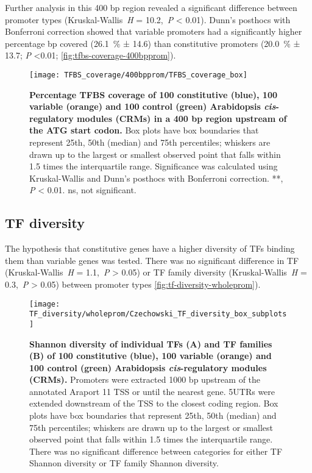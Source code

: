 \documentclass[../main.tex]{subfiles}
\begin{document}
Further analysis in this 400 bp region revealed a significant difference between promoter types (Kruskal\hyp{}Wallis~\textit{H} = 10.2,~\textit{P} \textless{} 0.01). Dunn's posthocs with Bonferroni correction showed that variable promoters had a significantly higher percentage bp covered (\SI{26.1}{\percent} ± 14.6) than constitutive promoters (\SI{20.0}{\percent} ± 13.7; \textit{P} \textless 0.01; \autoref{fig:tfbs-coverage-400bpprom}).

\begin{figure}[hbt!]
	\begin{center}
		\capstart
		\texttt{[image: TFBS\_coverage/400bpprom/TFBS\_coverage\_box]}
		\caption{
			\textbf{Percentage TFBS coverage of 100 constitutive (blue), 100 variable (orange) and 100 control (green) Arabidopsis \textit{cis}\hyp{}regulatory modules (CRMs) in a 400 bp region upstream of the ATG start codon.}
			Box plots have box boundaries that represent 25th, 50th (median) and 75th percentiles; whiskers are drawn up to the largest or smallest observed point that falls within 1.5 times the interquartile range.
			Significance was calculated using Kruskal\hyp{}Wallis and Dunn's posthocs with Bonferroni correction.
			**, \textit{P} \textless{} 0.01. ns, not significant.
			\label{fig:tfbs-coverage-400bpprom}
		}
	\end{center}
\end{figure}

\subsection{TF diversity}
The hypothesis that constitutive genes have a higher diversity of TFs binding them than variable genes was tested.
There was no significant difference in TF (Kruskal\hyp{}Wallis~\textit{H} = 1.1,~\textit{P} \textgreater{} 0.05) or TF family diversity (Kruskal\hyp{}Wallis~\textit{H} = 0.3,~\textit{P} \textgreater{} 0.05) between promoter types \autoref{fig:tf-diversity-wholeprom}).

\begin{figure}[hbt!]
	\begin{center}
		\capstart
		\texttt{[image: TF\_diversity/wholeprom/Czechowski\_TF\_diversity\_box\_subplots]}
		\caption{
			\textbf{Shannon diversity of individual TFs (A) and TF families (B) of 100 constitutive (blue), 100 variable (orange) and 100 control (green) Arabidopsis \textit{cis}\hyp{}regulatory modules (CRMs).}
			Promoters were extracted 1000 bp upstream of the annotated Araport 11 \autocite{chengAraport11CompleteReannotation2017} TSS or until the nearest gene.
			5UTRs were extended downstream of the TSS to the closest coding region.  Box plots have box boundaries that represent 25th, 50th (median) and 75th percentiles; whiskers are drawn up to the largest or smallest observed point that falls within 1.5 times the interquartile range.
			There was no significant difference between categories for either TF Shannon diversity or TF family Shannon diversity.
			\label{fig:tf-diversity-wholeprom}
		}
	\end{center}
\end{figure}
\end{document}
